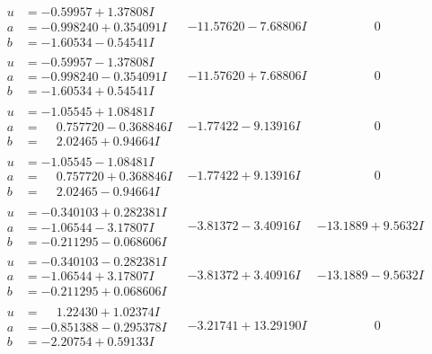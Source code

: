 \documentclass[1p]{elsarticle_modified}
\theoremstyle{definition}
\begin{document}
$$\begin{array}{c|c|c}
\begin{aligned}
u &= -0.59957 + 1.37808 I \\
a &= -0.998240 + 0.354091 I \\
b &= -1.60534 - 0.54541 I\end{aligned}
 & -11.57620 - 7.68806 I & \phantom{-0.000000 } 0 \\ \hline\begin{aligned}
u &= -0.59957 - 1.37808 I \\
a &= -0.998240 - 0.354091 I \\
b &= -1.60534 + 0.54541 I\end{aligned}
 & -11.57620 + 7.68806 I & \phantom{-0.000000 } 0 \\ \hline\begin{aligned}
u &= -1.05545 + 1.08481 I \\
a &= \phantom{-}0.757720 - 0.368846 I \\
b &= \phantom{-}2.02465 + 0.94664 I\end{aligned}
 & -1.77422 - 9.13916 I & \phantom{-0.000000 } 0 \\ \hline\begin{aligned}
u &= -1.05545 - 1.08481 I \\
a &= \phantom{-}0.757720 + 0.368846 I \\
b &= \phantom{-}2.02465 - 0.94664 I\end{aligned}
 & -1.77422 + 9.13916 I & \phantom{-0.000000 } 0 \\ \hline\begin{aligned}
u &= -0.340103 + 0.282381 I \\
a &= -1.06544 - 3.17807 I \\
b &= -0.211295 - 0.068606 I\end{aligned}
 & -3.81372 - 3.40916 I & -13.1889 + 9.5632 I \\ \hline\begin{aligned}
u &= -0.340103 - 0.282381 I \\
a &= -1.06544 + 3.17807 I \\
b &= -0.211295 + 0.068606 I\end{aligned}
 & -3.81372 + 3.40916 I & -13.1889 - 9.5632 I \\ \hline\begin{aligned}
u &= \phantom{-}1.22430 + 1.02374 I \\
a &= -0.851388 - 0.295378 I \\
b &= -2.20754 + 0.59133 I\end{aligned}
 & -3.21741 + 13.29190 I & \phantom{-0.000000 } 0 \\ \hline\begin{aligned}

\end{aligned}
\end{array}$$
\end{document}
